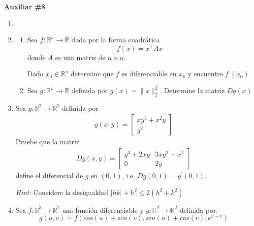 \documentclass[letterpaper,11pt]{article}
\newcommand{\norm}[1]{\lVert #1\rVert }
\begin{document}
\begin{center}
	\LARGE \bf{Auxiliar \#8 }\\
\end{center}

\vspace{-1cm}
\begin{enumerate}\setlength{\itemsep}{0.4cm}	
\item[]

\item
\begin{enumerate}
    \item Sea $f: \mathbb{R}^n\rightarrow\mathbb{R}$ dada por la forma cuadrática
    \[f(x)=x^\intercal Ax\]
    donde $A$ es una matriz de $n\times n$. \par
    Dado $x_0\in\mathbb{R}^n$ determine que $f$ es diferenciable en $x_0$ y encuentre $f^{\prime}(x_0)$
    
    \item Sea $g: \mathbb{R}^n\rightarrow\mathbb{R}$ definida por $g(x)=\norm{x}^2_2$. Determine la matriz $Dg(x)$
\end{enumerate}
\item Sea $g:\mathbb{R}^2\rightarrow\mathbb{R}^2$ definida por
\begin{align*}
    g(x,y)= 
    \begin{bmatrix}
    xy^3+x^2y\\
    y^2
    \end{bmatrix}
\end{align*}
Pruebe que la matriz 
\begin{align*}
    Dg(x,y)=
    \begin{bmatrix}
    y^3+2xy & 3xy^2+x^2\\
    0 & 2y
    \end{bmatrix}
\end{align*}
define el diferencial de $g$ en $(0,1)$, i.e, $Dg(0,1)=g^{\prime}(0,1)$.\par
\textit{Hint:} Considere la desigualdad $|hk|+h^2\leq2(h^2+k^2)$

\item Sea $f:\mathbb{R}^3\rightarrow\mathbb{R}^2$ una función diferenciable y $g:\mathbb{R}^2\rightarrow\mathbb{R}^2$ definida por:
\[g(u,v)=f\left(cos(u)+sin(v),sin(u)+cos(v), e^{u-v}\right)\]


\end{enumerate}
\end{document}
